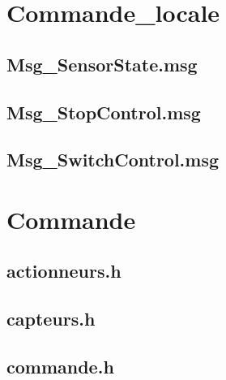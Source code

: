 \documentclass[a4paper,french, titlepage]{book}
\begin{document}
	
\section{Commande\_locale\label{annexe_packages_commandelocale}}

	\subsection{Msg\_SensorState.msg}
	
	
	
	\subsection{Msg\_StopControl.msg}
	
	
	
	\subsection{Msg\_SwitchControl.msg}
	
	






\section{Commande\label{annexe_packages_commande}}

	\subsection{actionneurs.h}
	
	
	
	\subsection{capteurs.h}
	
	
	
	\subsection{commande.h}
	
	
	
\end{document}

